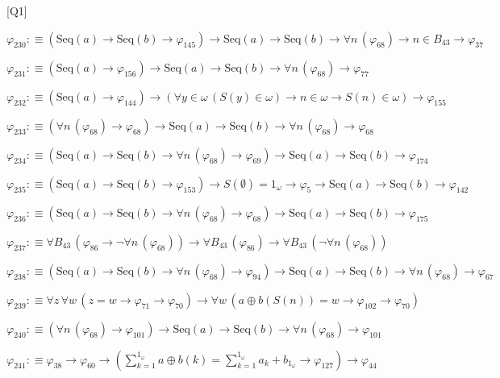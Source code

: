 \begin{fullproof}{[Q1]}
\begin{abbrevlist}
\item $\varphi_{230} :\equiv (\mathrm{Seq}(a) \to \mathrm{Seq}(b) \to \varphi_{145}) \to \mathrm{Seq}(a) \to \mathrm{Seq}(b) \to \forall n\,(\varphi_{68}) \to n \in B_{43} \to \varphi_{37}$
\item $\varphi_{231} :\equiv (\mathrm{Seq}(a) \to \varphi_{156}) \to \mathrm{Seq}(a) \to \mathrm{Seq}(b) \to \forall n\,(\varphi_{68}) \to \varphi_{77}$
\item $\varphi_{232} :\equiv (\mathrm{Seq}(a) \to \varphi_{144}) \to (\forall y \in \omega\,(S(y) \in \omega) \to n \in \omega \to S(n) \in \omega) \to \varphi_{155}$
\item $\varphi_{233} :\equiv (\forall n\,(\varphi_{68}) \to \varphi_{68}) \to \mathrm{Seq}(a) \to \mathrm{Seq}(b) \to \forall n\,(\varphi_{68}) \to \varphi_{68}$
\item $\varphi_{234} :\equiv (\mathrm{Seq}(a) \to \mathrm{Seq}(b) \to \forall n\,(\varphi_{68}) \to \varphi_{69}) \to \mathrm{Seq}(a) \to \mathrm{Seq}(b) \to \varphi_{174}$
\item $\varphi_{235} :\equiv (\mathrm{Seq}(a) \to \mathrm{Seq}(b) \to \varphi_{153}) \to S(\emptyset) = 1_{\omega} \to \varphi_{5} \to \mathrm{Seq}(a) \to \mathrm{Seq}(b) \to \varphi_{142}$
\item $\varphi_{236} :\equiv (\mathrm{Seq}(a) \to \mathrm{Seq}(b) \to \forall n\,(\varphi_{68}) \to \varphi_{68}) \to \mathrm{Seq}(a) \to \mathrm{Seq}(b) \to \varphi_{175}$
\item $\varphi_{237} :\equiv \forall B_{43}\,(\varphi_{86} \to \neg \forall n\,(\varphi_{68})) \to \forall B_{43}\,(\varphi_{86}) \to \forall B_{43}\,(\neg \forall n\,(\varphi_{68}))$
\item $\varphi_{238} :\equiv (\mathrm{Seq}(a) \to \mathrm{Seq}(b) \to \forall n\,(\varphi_{68}) \to \varphi_{94}) \to \mathrm{Seq}(a) \to \mathrm{Seq}(b) \to \forall n\,(\varphi_{68}) \to \varphi_{67}$
\item $\varphi_{239} :\equiv \forall z\,\forall w\,(z = w \to \varphi_{71} \to \varphi_{70}) \to \forall w\,(a \oplus b(S(n)) = w \to \varphi_{102} \to \varphi_{70})$
\item $\varphi_{240} :\equiv (\forall n\,(\varphi_{68}) \to \varphi_{101}) \to \mathrm{Seq}(a) \to \mathrm{Seq}(b) \to \forall n\,(\varphi_{68}) \to \varphi_{101}$
\item $\varphi_{241} :\equiv \varphi_{38} \to \varphi_{60} \to ({\textstyle\sum_{k=1}^{1_{\omega}} a \oplus b(k)} = {\textstyle\sum_{k=1}^{1_{\omega}} a_{k}} + b_{1_{\omega}} \to \varphi_{127}) \to \varphi_{44}$

\end{abbrevlist}
\end{fullproof}

